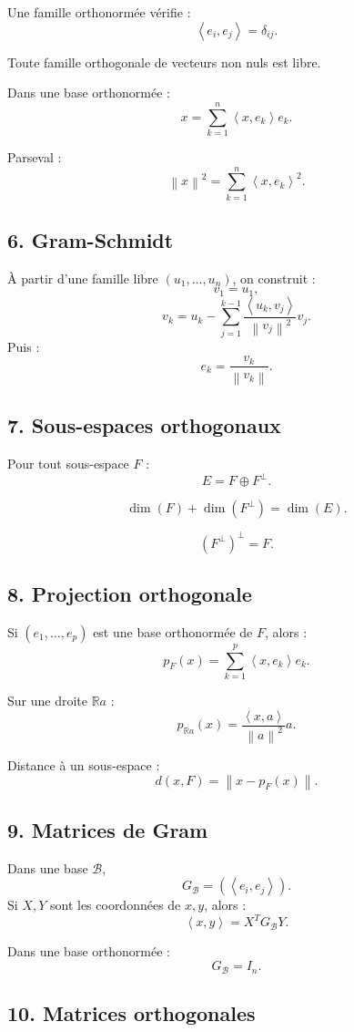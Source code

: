 \documentclass[11pt,a4paper]{article}
\newcommand{\R}{\mathbb R}
\newcommand{\norme}[1]{\left\lVert #1\right\rVert}
\newcommand{\scal}[2]{\left\langle #1,#2\right\rangle}
\begin{document}
Une famille orthonormée vérifie :
\[
\scal{e_i}{e_j}=\delta_{ij}.
\]

Toute famille orthogonale de vecteurs non nuls est libre.

Dans une base orthonormée :
\[
x=\sum_{k=1}^n\scal{x}{e_k}e_k.
\]

Parseval :
\[
\norme{x}^2=\sum_{k=1}^n\scal{x}{e_k}^2.
\]

\subsection*{6. Gram-Schmidt}

À partir d'une famille libre \((u_1,\dots,u_n)\), on construit :
\[
v_1=u_1,
\]
\[
v_k=u_k-\sum_{j=1}^{k-1}
\frac{\scal{u_k}{v_j}}{\norme{v_j}^2}v_j.
\]
Puis :
\[
e_k=\frac{v_k}{\norme{v_k}}.
\]

\subsection*{7. Sous-espaces orthogonaux}

Pour tout sous-espace \(F\) :
\[
E=F\oplus F^\perp.
\]

\[
\dim(F)+\dim(F^\perp)=\dim(E).
\]

\[
(F^\perp)^\perp=F.
\]

\subsection*{8. Projection orthogonale}

Si \((e_1,\dots,e_p)\) est une base orthonormée de \(F\), alors :
\[
p_F(x)=\sum_{k=1}^p\scal{x}{e_k}e_k.
\]

Sur une droite \(\R a\) :
\[
p_{\R a}(x)=\frac{\scal{x}{a}}{\norme{a}^2}a.
\]

Distance à un sous-espace :
\[
d(x,F)=\norme{x-p_F(x)}.
\]

\subsection*{9. Matrices de Gram}

Dans une base \(\mathcal B\),
\[
G_{\mathcal B}=(\scal{e_i}{e_j}).
\]
Si \(X,Y\) sont les coordonnées de \(x,y\), alors :
\[
\scal{x}{y}=X^TG_{\mathcal B}Y.
\]

Dans une base orthonormée :
\[
G_{\mathcal B}=I_n.
\]

\subsection*{10. Matrices orthogonales}
\end{document}
